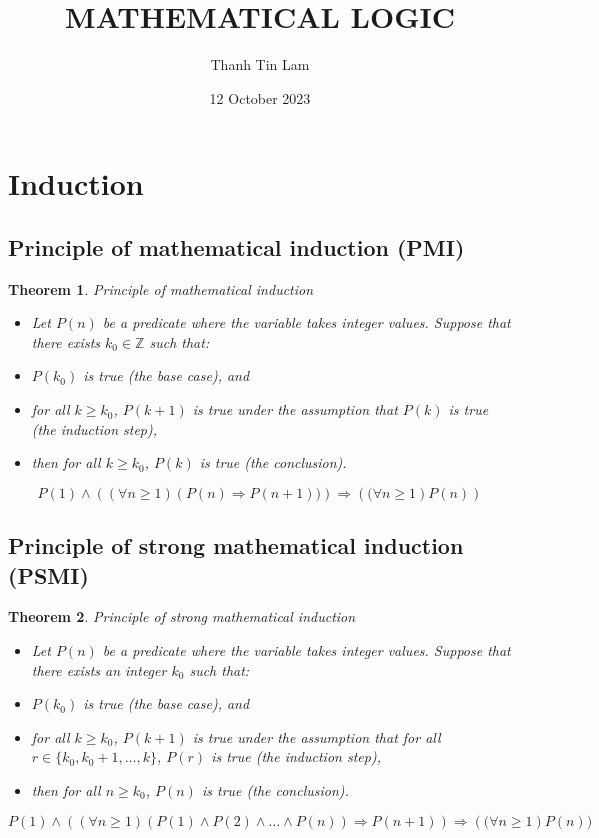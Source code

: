 \documentclass{article}
\title{\textbf{MATHEMATICAL LOGIC}}
\author{ Thanh Tin Lam}
\date{ 12 October 2023}
\newtheorem{theorem}{Theorem}[section]
\begin{document}
\maketitle
\vspace{2cm}
\section{Induction}
    \subsection{Principle of mathematical induction (PMI)}
\begin{theorem}{Principle of mathematical induction} 
\hspace{1mm} 
    \begin{itemize}
    \item Let $P(n)$ be a predicate where the variable takes integer values. Suppose that there exists $k_0 \in \mathbb{Z}$ such that:

    \item $P(k_0)$ is true (the base case), and
    \item for all $k \geq k_0$, $P(k + 1)$ is true under the assumption that $P(k)$ is true (the induction step),

    \item then for all $k \geq k_0$, $P(k)$ is true (the conclusion).
    \end{itemize}
 \begin{equation}
P(1) \land (\left(\forall n \geq 1 \right) \left(P(n) \Rightarrow P(n+1)) \right) \Rightarrow \left((\forall n \geq 1 \right) P(n))
\end{equation}
\end{theorem}

    \subsection{Principle of strong mathematical induction (PSMI)}
\begin{theorem}{Principle of strong mathematical induction}

    \begin{itemize}
    \item Let $P(n)$ be a predicate where the variable takes integer values. Suppose that there exists an integer $k_0$ such that:
    \item $P(k_0)$ is true (the base case), and
    \item for all $k \geq k_0$, $P(k+1)$ is true under the assumption that for all $r \in \{k_0, k_0 + 1, \ldots, k\}$, $P(r)$ is true (the induction step),
    \item then for all $n \geq k_0$, $P(n)$ is true (the conclusion).
    \end{itemize}
    \begin{equation}
        P(1) \land (\left( \forall n \geq 1 \right) \left( P(1) \land P(2) \land \ldots \land P(n) \right) \Rightarrow P(n+1)) \Rightarrow \left(( \forall n \geq 1 \right) P(n))
    \end{equation}
    \end{theorem}
\end{document}
